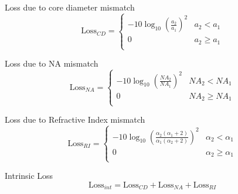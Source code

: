 \documentclass[12pt, onecolumn]{article}
\begin{document}
        Loss due to core diameter mismatch
        \begin{equation}
            \text{Loss}_{CD} = \begin{cases}
                -10 \log_{10} \left(\displaystyle\frac{a_2}{a_1}\right)^2 & a_2 < a_1 \\
                0 & a_2 \geq a_1 \\                
            \end{cases}
            \label{eq:cd_loss}
        \end{equation}

        Loss due to NA mismatch
        \begin{equation}
            \text{Loss}_{NA} = \begin{cases}
                -10 \log_{10} \left(\displaystyle\frac{NA_2}{NA_1}\right)^2 & NA_2 < NA_1 \\
                0 & NA_2 \geq NA_1 \\                
            \end{cases}
            \label{eq:na_loss}
        \end{equation}

        Loss due to Refractive Index mismatch
        \begin{equation}
            \text{Loss}_{RI} = \begin{cases}
                -10 \log_{10} \left(\displaystyle\frac{\alpha_2(\alpha_1 + 2)}{\alpha_1 (\alpha_2 + 2)}\right)^2 & \alpha_2 < \alpha_1 \\
                0 & \alpha_2 \geq \alpha_1 \\                
            \end{cases}
            \label{eq:ri_loss}
        \end{equation}

        Intrinsic Loss
        \begin{equation}
            \text{Loss}_{int} = \text{Loss}_{CD} + \text{Loss}_{NA} + \text{Loss}_{RI}
            \label{eq:intrinsic_loss}
        \end{equation}
\end{document}
